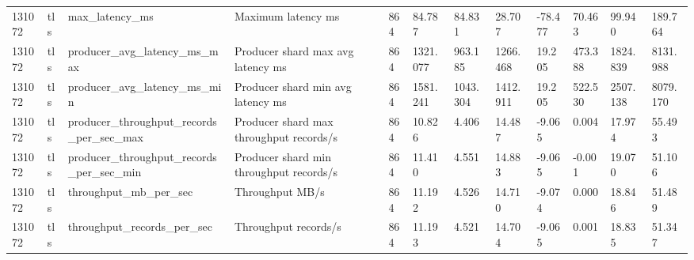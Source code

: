 \begin{longtable}{llllllllllll}
131072 & tls & max\_latency\_ms & Maximum latency ms & 864 & 84.787 & 84.831 & 28.707 & -78.477 & 70.463 & 99.940 & 189.764 \\
131072 & tls & producer\_avg\_latency\_ms\_max & Producer shard max avg latency ms & 864 & 1321.077 & 963.185 & 1266.468 & 19.205 & 473.388 & 1824.839 & 8131.988 \\
131072 & tls & producer\_avg\_latency\_ms\_min & Producer shard min avg latency ms & 864 & 1581.241 & 1043.304 & 1412.911 & 19.205 & 522.530 & 2507.138 & 8079.170 \\
131072 & tls & producer\_throughput\_records\_per\_sec\_max & Producer shard max throughput records/s & 864 & 10.826 & 4.406 & 14.487 & -9.065 & 0.004 & 17.974 & 55.493 \\
131072 & tls & producer\_throughput\_records\_per\_sec\_min & Producer shard min throughput records/s & 864 & 11.410 & 4.551 & 14.883 & -9.065 & -0.001 & 19.070 & 51.106 \\
131072 & tls & throughput\_mb\_per\_sec & Throughput MB/s & 864 & 11.192 & 4.526 & 14.710 & -9.074 & 0.000 & 18.846 & 51.489 \\
131072 & tls & throughput\_records\_per\_sec & Throughput records/s & 864 & 11.193 & 4.521 & 14.704 & -9.065 & 0.001 & 18.835 & 51.347 \\
\hline
\end{longtable}
